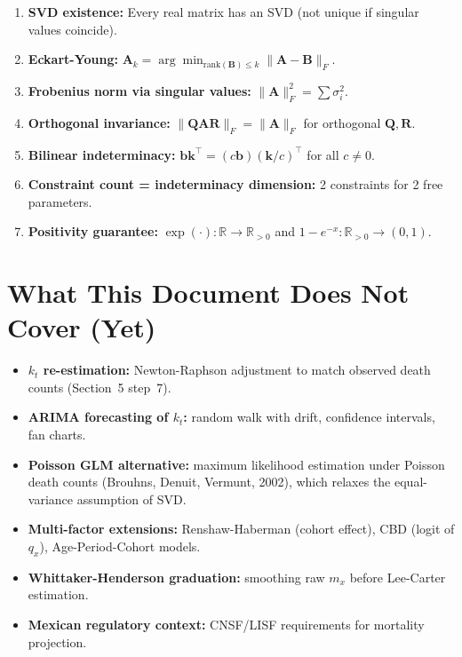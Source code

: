 \documentclass[11pt,a4paper]{article}
\begin{document}
\begin{enumerate}[nosep]
\item \textbf{SVD existence:} Every real matrix has an SVD (not unique if singular values coincide).
\item \textbf{Eckart-Young:} $\bm{A}_k = \arg\min_{\mathrm{rank}(\bm{B}) \leq k} \|\bm{A} - \bm{B}\|_F$.
\item \textbf{Frobenius norm via singular values:} $\|\bm{A}\|_F^2 = \sum \sigma_i^2$.
\item \textbf{Orthogonal invariance:} $\|\bm{Q}\bm{A}\bm{R}\|_F = \|\bm{A}\|_F$ for orthogonal $\bm{Q}, \bm{R}$.
\item \textbf{Bilinear indeterminacy:} $\bm{b}\bm{k}^\top = (c\bm{b})(\bm{k}/c)^\top$ for all $c \neq 0$.
\item \textbf{Constraint count = indeterminacy dimension:} 2 constraints for 2 free parameters.
\item \textbf{Positivity guarantee:} $\exp(\cdot): \mathbb{R} \to \mathbb{R}_{>0}$ and $1 - e^{-x}: \mathbb{R}_{>0} \to (0,1)$.
\end{enumerate}

\section{What This Document Does Not Cover (Yet)}

\begin{itemize}[nosep]
\item \textbf{$k_t$ re-estimation:} Newton-Raphson adjustment to match observed death counts (Section~5 step~7).
\item \textbf{ARIMA forecasting of $k_t$:} random walk with drift, confidence intervals, fan charts.
\item \textbf{Poisson GLM alternative:} maximum likelihood estimation under Poisson death counts
      (Brouhns, Denuit, Vermunt, 2002), which relaxes the equal-variance assumption of SVD.
\item \textbf{Multi-factor extensions:} Renshaw-Haberman (cohort effect), CBD (logit of $q_x$),
      Age-Period-Cohort models.
\item \textbf{Whittaker-Henderson graduation:} smoothing raw $m_x$ before Lee-Carter estimation.
\item \textbf{Mexican regulatory context:} CNSF/LISF requirements for mortality projection.
\end{itemize}
\end{document}
